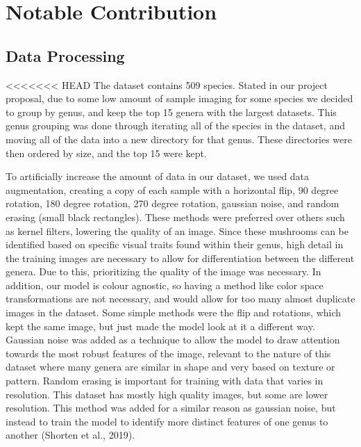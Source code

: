 \documentclass{article} %
\begin{document}
\FloatBarrier

\section{Notable Contribution}
\label{sec:notable_contribution}

\subsection{Data Processing}

<<<<<<< HEAD
The dataset contains 509 species. Stated in our project proposal, due to some low amount of sample imaging for some species we decided to group by genus, and keep the top 15 genera with the largest datasets. This genus grouping was done through iterating all of the species in the dataset, and moving all of the data into a new directory for that genus. These directories were then ordered by size, and the top 15 were kept.


To artificially increase the amount of data in our dataset, we used data augmentation, creating a copy of each sample with a horizontal flip, 90 degree rotation, 180 degree rotation, 270 degree rotation, gaussian noise, and random erasing (small black rectangles). These methods were preferred over others such as kernel filters, lowering the quality of an image. Since these mushrooms can be identified based on specific visual traits found within their genus, high detail in the training images are necessary to allow for differentiation between the different genera. Due to this, prioritizing the quality of the image was necessary. In addition, our model is colour agnostic, so having a method like color space transformations are not necessary, and would allow for too many almost duplicate images in the dataset. Some simple methods were the flip and rotations, which kept the same image, but just made the model look at it a different way. Gaussian noise was added as a technique to allow the model to draw attention towards the most robust features of the image, relevant to the nature of this dataset where many genera are similar in shape and very based on texture or pattern. Random erasing is important for training with data that varies in resolution. This dataset has mostly high quality images, but some are lower resolution. This method was added for a similar reason as gaussian noise, but instead to train the model to identify more distinct features of one genus to another (Shorten et al., 2019).

\FloatBarrier
\end{document}
